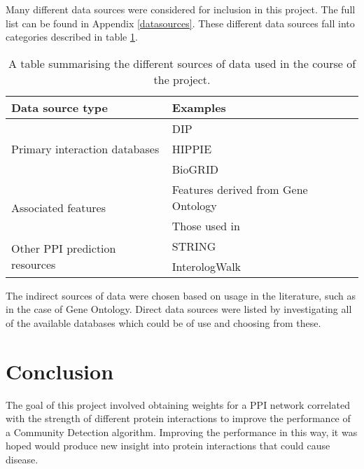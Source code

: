 Many different data sources were considered for inclusion in this project.
The full list can be found in Appendix \ref{datasources}.
These different data sources fall into categories described in table \ref{tab:sources}.

\begin{table}
    \centering
    \small
    \begin{tabular}{p{} p{}}
        Data source type                                & Examples \\
        \hline
        \multirow{3}{*}{\parbox{0.2\textwidth}{Primary interaction databases}}  & DIP\autocite{xenarios_dip_2002} \\
                                                        & HIPPIE\autocite{schaefer_hippie:_2012} \\ 
                                                        & BioGRID\autocite{stark_biogrid:_2006} \\
        \hline
        \multirow{2}{*}{\parbox{0.2\textwidth}{Associated features}}            & Features derived from Gene Ontology\autocite{ashburner_gene_2000} \\
                                                        & Those used in \textcite{rodgers-melnick_predicting_2013} \\
        \hline
        \multirow{2}{*}{\parbox{0.2\textwidth}{Other PPI prediction resources}} & STRING\autocite{vonMering_string_2005} \\
                                                        & InterologWalk\autocite{gallone_bio::homology::interologwalk_2011} \\
    \end{tabular}
    \caption{A table summarising the different sources of data used in the course of the project.}
    \label{tab:sources}
\end{table}

The indirect sources of data were chosen based on usage in the literature, such as in the case of Gene Ontology\autocite{qi_evaluation_2006}.
Direct data sources were listed by investigating all of the available databases which could be of use and choosing from these.

\section*{Conclusion}

The goal of this project involved obtaining weights for a PPI network correlated with the strength of different protein interactions to improve the performance of a Community Detection algorithm.
Improving the performance in this way, it was hoped would produce new insight into protein interactions that could cause disease.
